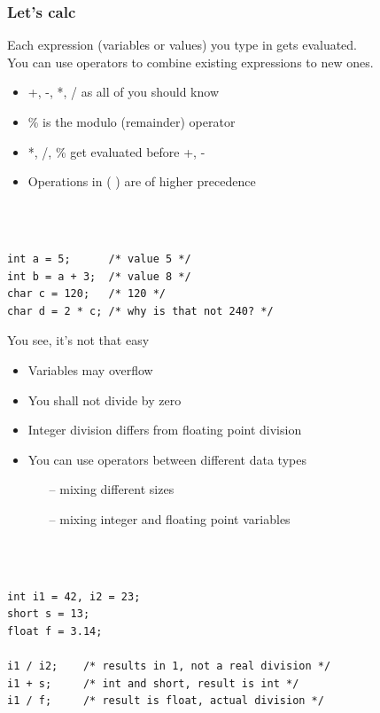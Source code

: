 \begin{frame}[fragile]
\frametitle{Let's calc}
	Each expression (variables or values) you type in gets evaluated.\\
	You can use operators to combine existing expressions to new ones.
\ \\
	\begin{itemize}
		\item +, -, *, / as all of you should know
		\item \% is the modulo (remainder) operator
		\item *, /, \% get evaluated before +, -
		\item Operations in (  ) are of higher precedence
	\end{itemize}\ \\\ \\
	\begin{lstlisting}
int a = 5;      /* value 5 */
int b = a + 3;  /* value 8 */
char c = 120;   /* 120 */
char d = 2 * c; /* why is that not 240? */
\end{lstlisting}
\end{frame}

\begin{frame}[fragile]{You see, it's not that easy}
	\begin{itemize}
		\item Variables may overflow
		\item You shall not divide by zero
		\item Integer division differs from floating point division
		\item You can use operators between different data types
		\begin{itemize}
			\item[--] mixing different sizes
			\item[--] mixing integer and floating point variables
		\end{itemize}
	\end{itemize}
	\ \\\ \\
	\begin{lstlisting}[numbers=none]
int i1 = 42, i2 = 23;
short s = 13;
float f = 3.14;

i1 / i2;    /* results in 1, not a real division */
i1 + s;     /* int and short, result is int */
i1 / f;     /* result is float, actual division */
\end{lstlisting}
\end{frame}

